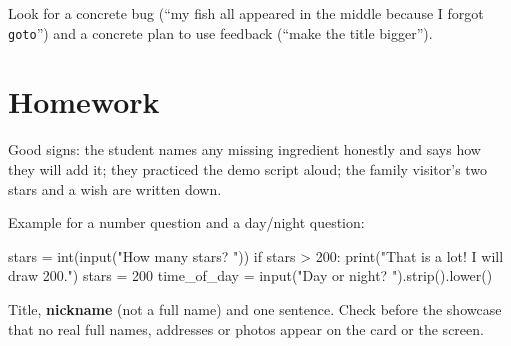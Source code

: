 \begin{answer}[Reflection]
Look for a concrete bug (\enquote{my fish all appeared in the middle because I forgot \texttt{goto}}) and a concrete plan to use feedback (\enquote{make the title bigger}).
\end{answer}

\section{Homework}
\begin{answer}
Good signs: the student names any missing ingredient honestly and says how they will add it; they practiced the demo script aloud; the family visitor's two stars and a wish are written down.
\end{answer}

\begin{answer}
Example for a number question and a day/night question:
\begin{pycode}
stars = int(input("How many stars? "))
if stars > 200:
    print("That is a lot! I will draw 200.")
    stars = 200
time_of_day = input("Day or night? ").strip().lower()
\end{pycode}
\end{answer}

\begin{answer}
Title, \textbf{nickname} (not a full name) and one sentence. Check before the showcase that no real full names, addresses or photos appear on the card or the screen.
\end{answer}

